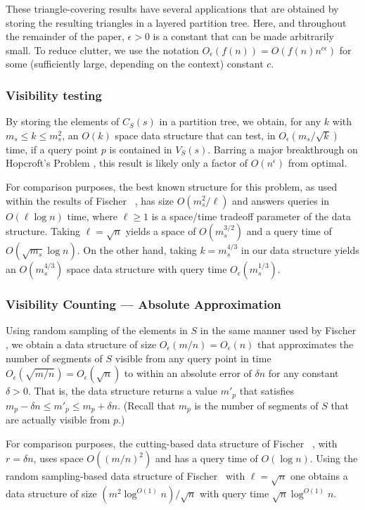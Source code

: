 \documentclass{patmorin}
\newcommand{\Oe}{O_\epsilon}
\begin{document}
These triangle-covering results have several applications that are
obtained by storing the resulting triangles in a layered partition tree.
Here, and throughout the remainder of the paper, $\epsilon > 0$ is a
constant that can be made arbitrarily small. To reduce clutter, we use the
notation $\Oe(f(n))=O(f(n)n^{c\epsilon})$ for some (sufficiently large,
depending on the context) constant $c$.

\subsubsection{Visibility testing} 

By storing the elements of $C_S(s)$ in a partition tree, we obtain, for
any $k$ with $m_s\le k\le m_s^2$, an $O(k)$ space data structure that can
test, in $\Oe(m_s/\sqrt{k})$ time, if a query point $p$ is contained in
$V_S(s)$.  Barring a major breakthrough on Hopcroft's Problem \cite{e96},
this result is likely only a factor of $O(n^\epsilon)$ from optimal.

For comparison purposes, the best known structure for this problem, as
used within the results of Fischer \etal\ \cite{fhjmz08,fhjmz09}, has
size $O(m_{s}^2/\ell)$ and answers queries in $O(\ell\log n)$ time, where
$\ell \ge 1$ is a space/time tradeoff parameter of the data structure.
Taking $\ell=\sqrt{n}$ yields a space of $O(m_s^{3/2})$ and a query
time of $O(\sqrt{m_s}\log n)$.  On the other hand, taking $k=m_s^{4/3}$
in our data structure yields an $O(m_s^{4/3})$ space data structure with
query time $\Oe(m_s^{1/3})$.

\subsubsection{Visibility Counting --- Absolute Approximation}

Using random sampling of the elements in $S$ in the same manner used
by Fischer \etal, we obtain a data structure of size $\Oe(m/n)=\Oe(n)$
that approximates the number of segments of $S$ visible from any query
point in time $\Oe(\sqrt{m/n})=\Oe(\sqrt{n})$ to within an absolute
error of $\delta n$ for any constant $\delta > 0$.  That is, the data
structure returns a value $m'_p$ that satisfies $m_p -\delta n \le m'_p
\le m_p+\delta n$.  (Recall that $m_p$ is the number of segments of $S$
that are actually visible from $p$.)

For comparison purposes, the cutting-based data structure of Fischer
\etal\ \cite{fhjmz08,fhjmz09}, with $r=\delta n$, uses space $O((m/n)^2)$
and has a query time of $O(\log n)$.  Using the random sampling-based
data structure of Fischer \etal\ with $\ell=\sqrt{n}$ one obtains a
data structure of size $(m^2\log^{O(1)} n)/\sqrt{n}$ with query time
$\sqrt{n}\log^{O(1)} n$.
\end{document}
